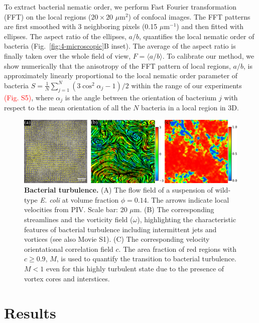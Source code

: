 To extract bacterial nematic order, we perform Fast Fourier transformation (FFT) on the local regions ($20 \times 20$ $\mu$m$^2$) of confocal images.
The FFT patterns are first smoothed with 3 neighboring pixels (0.15 $\mu$m$^{-1}$) and then fitted with ellipses. The aspect ratio of the ellipses, $a/b$, quantifies the local nematic order of bacteria (Fig.~\ref{fig:4-microscopic}B inset).
The average of the aspect ratio is finally taken over the whole field of view, $F = \langle a/b \rangle$. To calibrate our method, we show numerically that the anisotropy of the FFT pattern of local regions, $a/b$, is approximately linearly proportional to the local nematic order parameter of bacteria $S=\frac{1}{N}\sum_{j=1}^N(3\cos^2\alpha_j - 1)/2$ within the range of our experiments \textcolor{red}{(Fig. S5)}, where $\alpha_j$ is the angle between the orientation of bacterium $j$ with respect to the mean orientation of all the $N$ bacteria in a local region in 3D.

\begin{figure}[!ht]
	\begin{center}
	\includegraphics[width=5.5 in]{Figs/4-Emergence/1.pdf}
	\end{center}
	\caption[Bacterial turbulence]
	{
	\textbf{Bacterial turbulence.}
  (A) The flow field of a suspension of wild-type \textit{E. coli} at volume fraction $\phi=0.14$. The arrows indicate local velocities from PIV. Scale bar: 20 $\mu$m.
  (B) The corresponding streamlines and the vorticity field ($\omega$), highlighting the characteristic features of bacterial turbulence including intermittent jets and vortices (see also Movie S1).
  (C) The corresponding velocity orientational correlation field $c$. The area fraction of red regions with $c \ge 0.9$, $M$, is used to quantify the transition to bacterial turbulence. $M < 1$ even for this highly turbulent state due to the presence of vortex cores and interstices.
	}
	\label{fig:4-turbulence}
\end{figure}

\section{Results}

